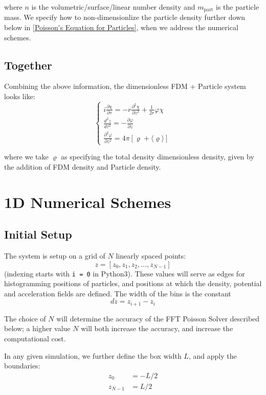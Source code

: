 \documentclass{book}
\newcommand{\pd}{\partial}
\begin{document}
where $n$ is the volumetric/surface/linear number density and $m_{\text{part}}$ is the particle mass. We specify how to non-dimensionlize the particle density further down below in \cref{Poisson's Equation for Particles}, when we address the numerical schemes.
    
\section{Together}
Combining the above information, the dimensionless FDM + Particle system looks like:
\begin{equation}
    \begin{cases}
    i\frac{\pd \chi}{\pd \tau} = -r\frac{\pd^2 \chi}{\pd z^2} + \frac{1}{2r}\varphi\chi \\
    
    \frac{d^2 z}{d\tau^2} = -\frac{\pd \varphi}{\pd z}\\
    
    \frac{\pd^2 \varphi}{\pd z^2} = 4\pi \left[{\varrho} +\langle{\varrho}\rangle\right]
    \end{cases}
    \label{FULL-NonDim}
\end{equation}

where we take ${\varrho}$ as specifying the total density dimensionless density, given by the addition of FDM density and Particle density.
\chapter{1D Numerical Schemes}

\section{Initial Setup}
The system is setup on a grid of $N$ linearly spaced points:
$$z = [z_0, z_1, z_2, ..., z_{N-1}]$$
(indexing starts with \texttt{i = 0} in Python3). These values will serve as edges for histogramming positions of particles, and positions at which the density, potential and acceleration fields are defined. The width of the bins is the constant
$$dz = z_{i+1} - z_i$$

The choice of $N$ will determine the accuracy of the FFT Poisson Solver described below; a higher value $N$ will both increase the accuracy, and increase the computational cost. 

In any given simulation, we further define the box width $L$, and apply the boundaries:
\begin{align}
    z_0 &= -L/2 \\ 
    z_{N-1} &= L/2
\end{align}
\end{document}
